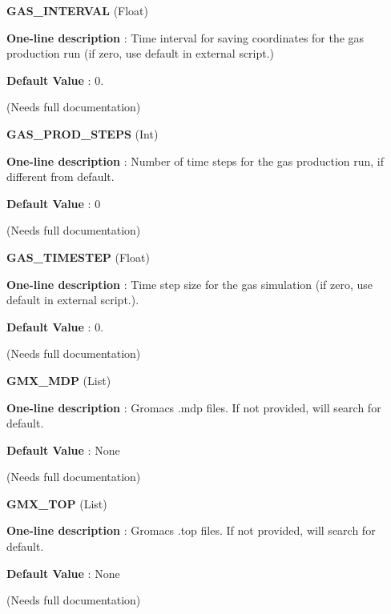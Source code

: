 \begin{DoxyItemize}
\item {\bfseries  \-G\-A\-S\-\_\-\-I\-N\-T\-E\-R\-V\-A\-L } (\-Float) \par
{\bfseries  \-One-\/line description }\-: \-Time interval for saving coordinates for the gas production run (if zero, use default in external script.) \par
{\bfseries  \-Default \-Value }\-: 0. \par
(\-Needs full documentation)\end{DoxyItemize}
\begin{DoxyItemize}
\item {\bfseries  \-G\-A\-S\-\_\-\-P\-R\-O\-D\-\_\-\-S\-T\-E\-P\-S } (\-Int) \par
{\bfseries  \-One-\/line description }\-: \-Number of time steps for the gas production run, if different from default. \par
{\bfseries  \-Default \-Value }\-: 0 \par
(\-Needs full documentation)\end{DoxyItemize}
\begin{DoxyItemize}
\item {\bfseries  \-G\-A\-S\-\_\-\-T\-I\-M\-E\-S\-T\-E\-P } (\-Float) \par
{\bfseries  \-One-\/line description }\-: \-Time step size for the gas simulation (if zero, use default in external script.). \par
{\bfseries  \-Default \-Value }\-: 0. \par
(\-Needs full documentation)\end{DoxyItemize}
\begin{DoxyItemize}
\item {\bfseries  \-G\-M\-X\-\_\-\-M\-D\-P } (\-List) \par
{\bfseries  \-One-\/line description }\-: \-Gromacs .mdp files. \-If not provided, will search for default. \par
{\bfseries  \-Default \-Value }\-: \-None \par
(\-Needs full documentation)\end{DoxyItemize}
\begin{DoxyItemize}
\item {\bfseries  \-G\-M\-X\-\_\-\-T\-O\-P } (\-List) \par
{\bfseries  \-One-\/line description }\-: \-Gromacs .top files. \-If not provided, will search for default. \par
{\bfseries  \-Default \-Value }\-: \-None \par
(\-Needs full documentation)\end{DoxyItemize}
